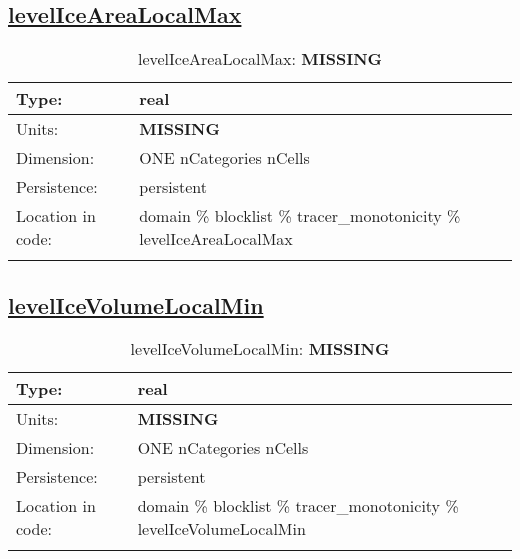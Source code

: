 \subsection[levelIceAreaLocalMax]{\hyperref[sec:var_tab_tracer_monotonicity]{levelIceAreaLocalMax}}
\label{subsec:var_sec_tracer_monotonicity_levelIceAreaLocalMax}
\begin{center}
\begin{longtable}{| p{2.0in} | p{4.0in} |}
        \hline 
        Type: & real \\
        \hline 
        Units: & {\bf \color{red} MISSING} \\
        \hline 
        Dimension: & ONE nCategories nCells \\
        \hline 
        Persistence: & persistent \\
        \hline 
         Location in code: & domain \% blocklist \% tracer\_monotonicity \% levelIceAreaLocalMax \\
         \hline 
    \caption{levelIceAreaLocalMax: {\bf \color{red} MISSING}}
\end{longtable}
\end{center}
\subsection[levelIceVolumeLocalMin]{\hyperref[sec:var_tab_tracer_monotonicity]{levelIceVolumeLocalMin}}
\label{subsec:var_sec_tracer_monotonicity_levelIceVolumeLocalMin}
\begin{center}
\begin{longtable}{| p{2.0in} | p{4.0in} |}
        \hline 
        Type: & real \\
        \hline 
        Units: & {\bf \color{red} MISSING} \\
        \hline 
        Dimension: & ONE nCategories nCells \\
        \hline 
        Persistence: & persistent \\
        \hline 
         Location in code: & domain \% blocklist \% tracer\_monotonicity \% levelIceVolumeLocalMin \\
         \hline 
    \caption{levelIceVolumeLocalMin: {\bf \color{red} MISSING}}
\end{longtable}
\end{center}

